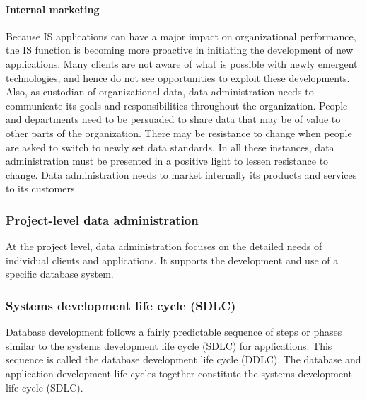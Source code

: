 \documentclass[
]{article}
\begin{document}
\hypertarget{internal-marketing}{%
\paragraph*{Internal marketing}\label{internal-marketing}}

Because IS applications can have a major impact on organizational
performance, the IS function is becoming more proactive in initiating
the development of new applications. Many clients are not aware of what
is possible with newly emergent technologies, and hence do not see
opportunities to exploit these developments. Also, as custodian of
organizational data, data administration needs to communicate its goals
and responsibilities throughout the organization. People and departments
need to be persuaded to share data that may be of value to other parts
of the organization. There may be resistance to change when people are
asked to switch to newly set data standards. In all these instances,
data administration must be presented in a positive light to lessen
resistance to change. Data administration needs to market internally its
products and services to its customers.

\hypertarget{project-level-data-administration}{%
\subsubsection*{Project-level data administration}\label{project-level-data-administration}}

At the project level, data administration focuses on the detailed needs
of individual clients and applications. It supports the development and
use of a specific database system.

\hypertarget{systems-development-life-cycle-sdlc}{%
\subsubsection*{Systems development life cycle (SDLC)}\label{systems-development-life-cycle-sdlc}}

Database development follows a fairly predictable sequence of steps or
phases similar to the systems development life cycle (SDLC) for
applications. This sequence is called the database development life
cycle (DDLC). The database and application development life cycles
together constitute the systems development life cycle (SDLC).
\end{document}
